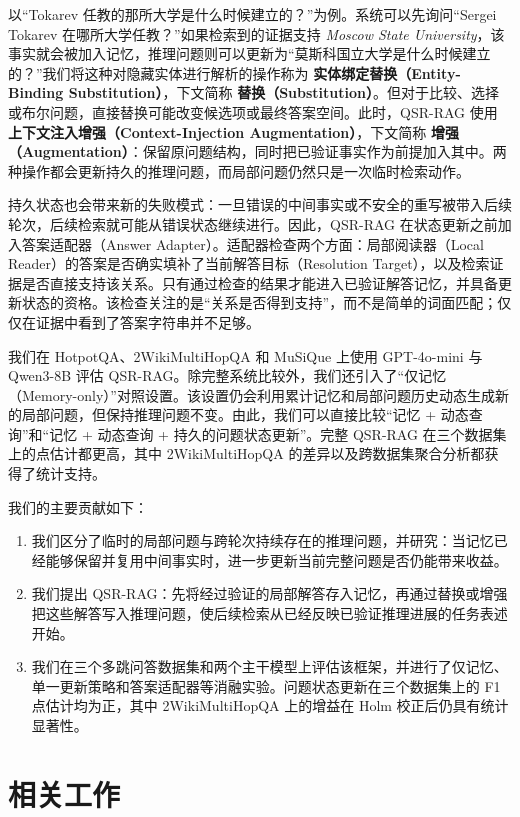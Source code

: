 \documentclass[11pt]{article}
\begin{document}
	以“Tokarev 任教的那所大学是什么时候建立的？”为例。系统可以先询问“Sergei Tokarev 在哪所大学任教？”如果检索到的证据支持 \emph{Moscow State University}，该事实就会被加入记忆，推理问题则可以更新为“莫斯科国立大学是什么时候建立的？”我们将这种对隐藏实体进行解析的操作称为 \textbf{实体绑定替换（Entity-Binding Substitution）}，下文简称 \textbf{替换（Substitution）}。但对于比较、选择或布尔问题，直接替换可能改变候选项或最终答案空间。此时，QSR-RAG 使用 \textbf{上下文注入增强（Context-Injection Augmentation）}，下文简称 \textbf{增强（Augmentation）}：保留原问题结构，同时把已验证事实作为前提加入其中。两种操作都会更新持久的推理问题，而局部问题仍然只是一次临时检索动作。

	持久状态也会带来新的失败模式：一旦错误的中间事实或不安全的重写被带入后续轮次，后续检索就可能从错误状态继续进行。因此，QSR-RAG 在状态更新之前加入答案适配器（Answer Adapter）。适配器检查两个方面：局部阅读器（Local Reader）的答案是否确实填补了当前解答目标（Resolution Target），以及检索证据是否直接支持该关系。只有通过检查的结果才能进入已验证解答记忆，并具备更新状态的资格。该检查关注的是“关系是否得到支持”，而不是简单的词面匹配；仅仅在证据中看到了答案字符串并不足够。

	我们在 HotpotQA、2WikiMultiHopQA 和 MuSiQue 上使用 GPT-4o-mini 与 Qwen3-8B 评估 QSR-RAG。除完整系统比较外，我们还引入了“仅记忆（Memory-only）”对照设置。该设置仍会利用累计记忆和局部问题历史动态生成新的局部问题，但保持推理问题不变。由此，我们可以直接比较“记忆 + 动态查询”和“记忆 + 动态查询 + 持久的问题状态更新”。完整 QSR-RAG 在三个数据集上的点估计都更高，其中 2WikiMultiHopQA 的差异以及跨数据集聚合分析都获得了统计支持。

	我们的主要贡献如下：
	\begin{enumerate}
		\item 我们区分了临时的局部问题与跨轮次持续存在的推理问题，并研究：当记忆已经能够保留并复用中间事实时，进一步更新当前完整问题是否仍能带来收益。
		\item 我们提出 QSR-RAG：先将经过验证的局部解答存入记忆，再通过替换或增强把这些解答写入推理问题，使后续检索从已经反映已验证推理进展的任务表述开始。
		\item 我们在三个多跳问答数据集和两个主干模型上评估该框架，并进行了仅记忆、单一更新策略和答案适配器等消融实验。问题状态更新在三个数据集上的 F1 点估计均为正，其中 2WikiMultiHopQA 上的增益在 Holm 校正后仍具有统计显著性。
	\end{enumerate}

	\section{相关工作}
\end{document}
